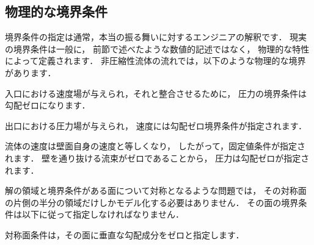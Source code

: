 \subsection{物理的な境界条件}
\label{ssec:2.6.1}
境界条件の指定は通常，本当の振る舞いに対するエンジニアの解釈です．
現実の境界条件は一般に，
前節で述べたような数値的記述ではなく，
%
物理的な特性によって定義されます．
非圧縮性流体の流れでは，以下のような物理的な境界があります．
\begin{description}
%
 \item[入口] 入口における速度場が与えられ，それと整合させるために，
            圧力の境界条件は勾配ゼロになります．
%
 \item[出口] 出口における圧力場が与えられ，
            速度には勾配ゼロ境界条件が指定されます．
%
 \item[滑りなし不浸透性壁面] 流体の速度は壁面自身の速度と等しくなり，
            したがって，固定値条件が指定されます．
            壁を通り抜ける流束がゼロであることから，
            圧力は勾配ゼロが指定されます．
\end{description}

解の領域と境界条件がある面について対称となるような問題では，
その対称面の片側の半分の領域だけしかモデル化する必要はありません．
その面の境界条件は以下に従って指定しなければなりません．
\begin{description}
%
 \item[対称面] 対称面条件は，その面に垂直な勾配成分をゼロと指定します．
\end{description}
